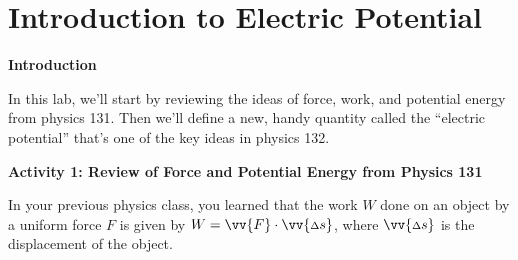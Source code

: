 \section{Introduction to Electric Potential}
\label{potential_intro}

\makelabheader %

\bigskip

\textbf{Introduction} 

In this lab, we'll start by reviewing the ideas of force, work, and potential energy from physics 131.  Then we'll define a new, handy quantity called the ``electric potential'' that's one of the key ideas in physics 132.

\bigskip

\textbf{Activity 1: Review of Force and Potential Energy from Physics 131}

In your previous physics class, you learned that the work $W$ done on an object by a uniform force $F$ is given by $W=\vv{F} \cdot \vv{{\scriptstyle \Delta} s}$, where $\vv{{\scriptstyle \Delta} s}$ is the displacement of the object.

